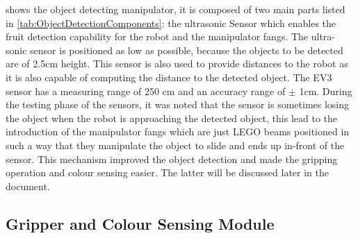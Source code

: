 \noindent {} shows the object detecting manipulator, it is composed of two main parts listed in \vref{tab:ObjectDetectionComponents}: the ultrasonic Sensor which enables the fruit detection capability for the robot and the manipulator fangs. The ultra-sonic sensor is positioned as low as possible, because the objects to be detected are of 2.5cm height. This sensor is also used to provide distances to the robot as it is also capable of computing the distance to the detected object. The EV3 sensor has a measuring range of 250 cm and an accuracy range of $\pm$ 1cm. During the testing phase of the sensors, it was noted that the sensor is sometimes losing the object when the robot is approaching the detected object, this lead to the introduction of the manipulator fangs which are just LEGO beams positioned in such a way that they manipulate the object to slide and ends up in-front of the sensor. This mechanism improved the object detection and made the gripping operation and colour sensing easier. The latter will be discussed later in the document.
\vspace{-5mm}
\subsection{Gripper and Colour Sensing Module}\label{sec:Gripper}

